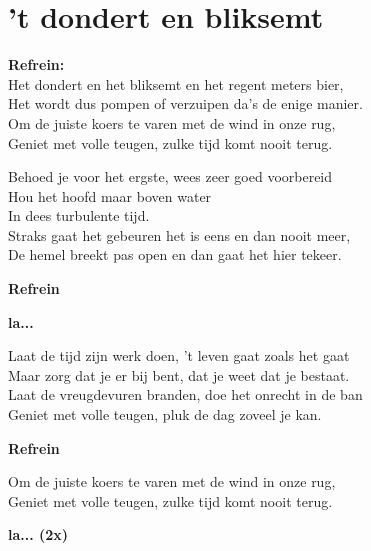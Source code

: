 \section{'t dondert en bliksemt}

\textbf{Refrein:}\\
Het dondert en het bliksemt en het regent meters bier,\\
Het wordt dus pompen of verzuipen da's de enige manier.\\
Om de juiste koers te varen met de wind in onze rug,\\
Geniet met volle teugen, zulke tijd komt nooit terug.

Behoed je voor het ergste, wees zeer goed voorbereid\\
Hou het hoofd maar boven water\\
In dees turbulente tijd.\\
Straks gaat het gebeuren het is eens en dan nooit meer,\\
De hemel breekt pas open en dan gaat het hier tekeer.

\textbf{Refrein}

\textbf{la...}

Laat de tijd zijn werk doen, 't leven gaat zoals het gaat\\
Maar zorg dat je er bij bent, dat je weet dat je bestaat.\\
Laat de vreugdevuren branden, doe het onrecht in de ban\\
Geniet met volle teugen, pluk de dag zoveel je kan.

\textbf{Refrein}

Om de juiste koers te varen met de wind in onze rug,\\
Geniet met volle teugen, zulke tijd komt nooit terug.

\textbf{la... (2x)}
